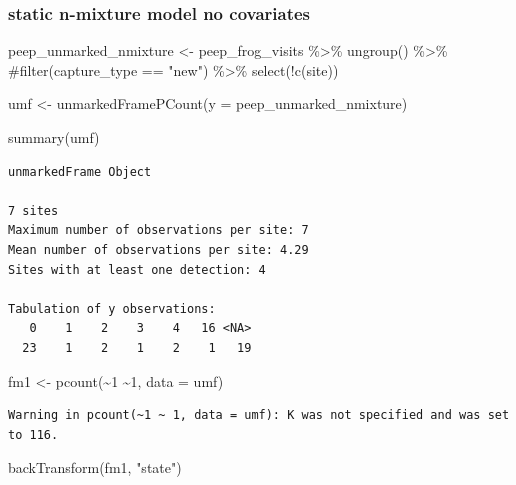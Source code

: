 \documentclass[
  letterpaper,
  DIV=11,
  numbers=noendperiod]{scrartcl}
\newenvironment{Shaded}{\begin{snugshade}}{\end{snugshade}}
\newcommand{\AttributeTok}[1]{\textcolor[rgb]{0.40,0.45,0.13}{#1}}
\newcommand{\CommentTok}[1]{\textcolor[rgb]{0.37,0.37,0.37}{#1}}
\newcommand{\DecValTok}[1]{\textcolor[rgb]{0.68,0.00,0.00}{#1}}
\newcommand{\FunctionTok}[1]{\textcolor[rgb]{0.28,0.35,0.67}{#1}}
\newcommand{\NormalTok}[1]{\textcolor[rgb]{0.00,0.23,0.31}{#1}}
\newcommand{\OtherTok}[1]{\textcolor[rgb]{0.00,0.23,0.31}{#1}}
\newcommand{\SpecialCharTok}[1]{\textcolor[rgb]{0.37,0.37,0.37}{#1}}
\newcommand{\StringTok}[1]{\textcolor[rgb]{0.13,0.47,0.30}{#1}}
\begin{document}
\hypertarget{static-n-mixture-model-no-covariates}{%
\subsubsection{static n-mixture model no
covariates}\label{static-n-mixture-model-no-covariates}}

\begin{Shaded}
\begin{Highlighting}[]
\NormalTok{peep\_unmarked\_nmixture }\OtherTok{\textless{}{-}}\NormalTok{ peep\_frog\_visits }\SpecialCharTok{\%\textgreater{}\%} 
  \FunctionTok{ungroup}\NormalTok{() }\SpecialCharTok{\%\textgreater{}\%} 
  \CommentTok{\#filter(capture\_type == "new") \%\textgreater{}\% }
  \FunctionTok{select}\NormalTok{(}\SpecialCharTok{!}\FunctionTok{c}\NormalTok{(site)) }


\NormalTok{umf }\OtherTok{\textless{}{-}} \FunctionTok{unmarkedFramePCount}\NormalTok{(}\AttributeTok{y =}\NormalTok{ peep\_unmarked\_nmixture)}

\FunctionTok{summary}\NormalTok{(umf)}
\end{Highlighting}
\end{Shaded}

\begin{verbatim}
unmarkedFrame Object

7 sites
Maximum number of observations per site: 7 
Mean number of observations per site: 4.29 
Sites with at least one detection: 4 

Tabulation of y observations:
   0    1    2    3    4   16 <NA> 
  23    1    2    1    2    1   19 
\end{verbatim}

\begin{Shaded}
\begin{Highlighting}[]
\NormalTok{fm1 }\OtherTok{\textless{}{-}} \FunctionTok{pcount}\NormalTok{(}\SpecialCharTok{\textasciitilde{}}\DecValTok{1} \SpecialCharTok{\textasciitilde{}}\DecValTok{1}\NormalTok{, }\AttributeTok{data =}\NormalTok{ umf)}
\end{Highlighting}
\end{Shaded}

\begin{verbatim}
Warning in pcount(~1 ~ 1, data = umf): K was not specified and was set to 116.
\end{verbatim}

\begin{Shaded}
\begin{Highlighting}[]
\FunctionTok{backTransform}\NormalTok{(fm1, }\StringTok{"state"}\NormalTok{) }
\end{Highlighting}
\end{Shaded}
\end{document}
